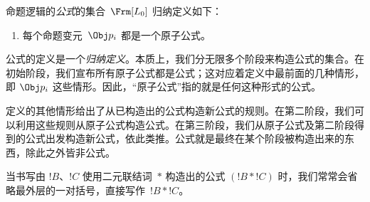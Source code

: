 \documentclass[../../../include/open-logic-section]{subfiles}
\begin{document}
\begin{defn}[公式]
命题逻辑的\emph{公式}的集合~$\Frm[L_0]$ 归纳定义如下：
\begin{enumerate}


\item 每个命题变元~$\Obj p_i$ 都是一个原子公式。






\end{enumerate}
\end{defn}

\begin{explain}
公式的定义是一个\emph{归纳定义}。本质上，我们分无限多个阶段来构造公式的集合。在初始阶段，我们宣布所有原子公式都是公式；这对应着定义中最前面的几种情形，即
%
%
$\Obj p_i$ 这些情形。因此，“原子公式”指的就是任何这种形式的公式。

定义的其他情形给出了从已构造出的公式构造新公式的规则。在第二阶段，我们可以利用这些规则从原子公式构造公式。在第三阶段，我们从原子公式及第二阶段得到的公式出发构造新公式，依此类推。公式就是最终在某个阶段被构造出来的东西，除此之外皆非公式。
\end{explain}

当书写由 $!B$、$!C$ 使用二元联结词~$\ast$ 构造出的公式 $(!B \ast !C)$ 时，我们常常会省略最外层的一对括号，直接写作~$!B \ast !C$。
\end{document}
